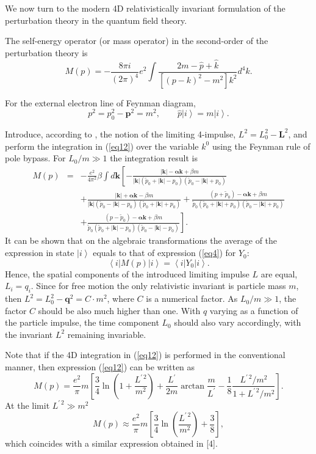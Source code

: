 \documentclass[a4paper,draft,showpacs,preprint,prd,aps]{revtex4}
\begin{document}
We now turn to the modern 4D relativistically invariant formulation of the
perturbation theory in the quantum field theory.

The self-energy operator (or mass operator) in the second-order of the
perturbation theory is
\begin{equation}
\label{eq12}
M(p) = - \frac{8\pi i}{(2\pi)^4}e^2
\int \frac{2m - \hat{p} + \hat{k}}{[(p-k)^2 - m^2] k^2}d^4k.
\end{equation}

For the external electron line of Feynman diagram,
\[
p^2 = p_0^2 -\bm{p}^2 = m^2,\quad \quad \hat{p}\left| i \right\rangle =
m\left| i \right\rangle.
\]

Introduce, according to \cite{ref4}, the notion of the limiting 4-impulse,
$L^2 = L_0^2 - \bm{L}^2$, and perform the integration in (\ref{eq12})
over the variable $k^0$ using the Feynman rule of pole bypass.
For $L_0/m\gg 1$ the integration result is
\begin{eqnarray*}
M(p)& =& - \frac{e^2}{4\pi^2}\beta
\int d\bm{k}\left[
-\frac{|\bm{k}| - \bm{\alpha}\bm{k} + \beta m}
{|\bm{k}|(\tilde{p}_0 + |\bm{k}| - p_0)
(\tilde{p}_0 - |\bm{k}| + p_0)} \right.\\
&&+\frac{|\bm{k}| + \bm{\alpha}\bm{k} - \beta m}
{|\bm{k}|(\tilde{p}_0 - |\bm{k}| - p_0)
(\tilde{p}_0 + |\bm{k}| + p_0)}+
\frac{(p+\tilde{p}_0) - \bm{\alpha}\bm{k} + \beta m}
{\tilde{p}_0(\tilde{p}_0 + |\bm{k}| + p_0)
(\tilde{p}_0 - |\bm{k}| + p_0)}\\
&&+\left.\frac{(p-\tilde{p}_0) - \bm{\alpha}\bm{k} + \beta m}
{\tilde{p}_0(\tilde{p}_0 + |\bm{k}| - p_0)
(\tilde{p}_0 - |\bm{k}| - p_0)}\right].
\end{eqnarray*}
It can be shown that on the algebraic transformations the average of the
expression in state $\left| i \right\rangle $ equals to that of expression
(\ref{eq4}) for $Y_0$:
\[
\left\langle i \right|M(p)\left| i \right\rangle =
\left\langle i \right|Y_0 \left| i \right\rangle .
\]
Hence, the spatial components of the introduced limiting impulse $L$
are equal, $L_i = q_i$. Since for free motion the only relativistic
invariant is particle mass $m$, then $L^2 = L_0^2 - \bm{q}^2= C \cdot m^2$,
where $C$ is a numerical factor. As $L_0/m \gg 1$, the factor $C$
should be also much higher than one. With $q$ varying as a function of the
particle impulse, the time component $L_0$ should also vary accordingly,
with
the invariant $L^2$ remaining invariable.

Note that if the 4D integration in (\ref{eq12}) is performed in the
conventional
manner, then expression (\ref{eq12}) can be written as
\begin{equation}
\label{eq13}
M(p) = \frac{e^2}{\pi}m\left[\frac 34\ln\left(1 + \frac{L^{\prime\,2}}
{m^2}\right) + \frac{L^\prime}{2m}\arctan\frac m{L^\prime} -
\frac 18\frac{L^{\prime\,2}/m^2}{1 + L^{\prime\,2}/m^2}
\right].
\end{equation}
At the limit $L^{\prime\,2} \gg m^2$
$$
M(p) \approx \frac{e^2}\pi m\left[\frac 34
\ln\left(\frac{L^{\prime\,2}}{m^2}\right) + \frac 38 \right],
$$
which coincides with a similar expression obtained in [4].
\end{document}
